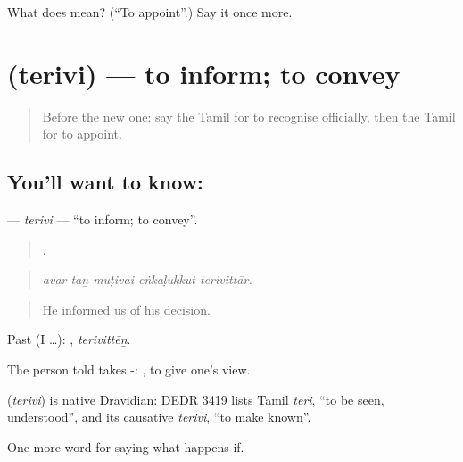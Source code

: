 \begin{tcolorbox}[breakable,colback=teal!4,colframe=teal!35!black,title={Before you move on}]
What does  mean? (\textquotedblleft{}To appoint\textquotedblright{}.) Say it once more.
\end{tcolorbox}
\section[\texorpdfstring{\ta{தெரிவி} (terivi)}{தெரிவி (terivi)}]{ (terivi) — to inform; to convey}

\label{lesson:TA-C388-terivi}



\begin{quote}
Before the new one: say the Tamil for to recognise officially, then the Tamil for to appoint.
\end{quote}

\subsection*{You'll want to know: }
\textbf{} — \emph{terivi} — \textquotedblleft{}to inform; to convey\textquotedblright{}.

\begin{quote}
    .
\end{quote}

\begin{quote}
\emph{avar taṉ muṭivai eṅkaḷukkut terivittār.}
\end{quote}

\begin{quote}
He informed us of his decision.
\end{quote}

Past (I …): , \emph{terivittēṉ}.

The person told takes -:  , to give one's view.

\begin{cousinweb}
\textbf{} (\emph{terivi}) is native Dravidian: DEDR 3419 lists Tamil \emph{teri}, \textquotedblleft{}to be seen, understood\textquotedblright{}, and its causative \emph{terivi}, \textquotedblleft{}to make known\textquotedblright{}.
\end{cousinweb}

\begin{grammarlens}[title={What you've built}]
One more word for saying what happens if.
\end{grammarlens}

